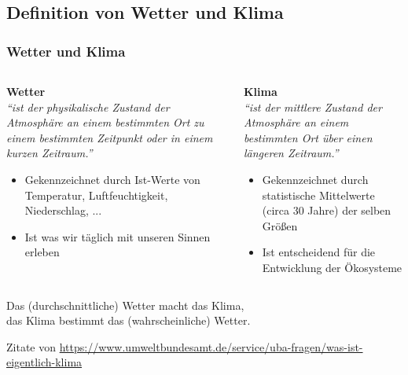 \subsection{Definition von Wetter und Klima}

\begin{frame}


	\frametitle{Wetter und Klima}
	\begin{columns}[onlytextwidth]
		\begin{column}[t]{0.49\linewidth}
			\textbf{Wetter}\\
			\textit{\enquote{ist der physikalische Zustand der Atmosphäre an einem bestimmten Ort zu einem \alert{bestimmten Zeitpunkt} oder in einem kurzen Zeitraum.}}
			\begin{itemize}
				\item Gekennzeichnet durch Ist-Werte von Temperatur, Luftfeuchtigkeit, Niederschlag, ...
				\item Ist was wir täglich mit unseren Sinnen erleben
			\end{itemize}
		\end{column}%
		\begin{column}[t]{0.49\linewidth}
			\textbf{Klima}\\
			\textit{\enquote{ist der mittlere Zustand der Atmosphäre an einem bestimmten Ort über einen \alert{längeren Zeitraum.}}}
			\begin{itemize}
				\item Gekennzeichnet durch statistische Mittelwerte (circa 30 Jahre) der selben Größen
				\item Ist entscheidend für die Entwicklung der Ökosysteme
			\end{itemize}
		\end{column}%
	\end{columns}
	\pause
	\bigskip
	\begin{center}
		Das (durchschnittliche) Wetter macht das Klima, \\
		das Klima bestimmt das (wahrscheinliche) Wetter.
	\end{center}

	\vfill
	\tiny{Zitate von \url{https://www.umweltbundesamt.de/service/uba-fragen/was-ist-eigentlich-klima}}


\end{frame}
